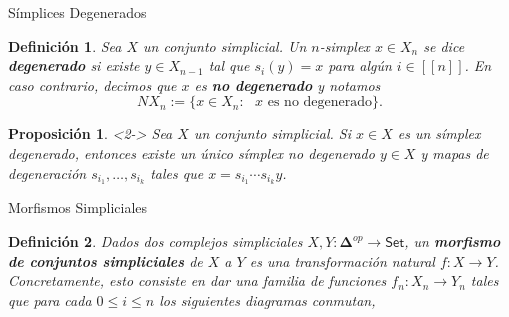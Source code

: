 \documentclass[11pt]{beamer}
\newcommand{\nat}[1]{[\![#1]\!]}
\newcommand{\ord}[1]{\nat{#1}}
\newcommand{\cat}[1]{\mathsf{#1}}
\newcommand{\ordcat}{\boldsymbol{\Delta}}
\newtheorem{defs}{Definición}
\newtheorem{prop}{Proposición}
\begin{document}
\begin{frame}{Símplices Degenerados}
\begin{defs} Sea $X$ un conjunto simplicial. Un $n$-simplex $x \in X_n$ se dice \textbf{degenerado} si existe $y \in X_{n-1}$ tal que $s_i(y) = x$ para algún $i \in \ord{n}$. En caso contrario, decimos que $x$ es \textbf{no degenerado} y notamos 
\[
NX_n := \{x \in X_n : \text{ $x$ es no degenerado}\}.
\]
\end{defs}

\begin{prop}<2->  Sea $X$ un conjunto simplicial. Si $x \in X$ es un símplex degenerado, entonces existe un único símplex no degenerado $y \in X$ y mapas de degeneración $s_{i_1},\dots, s_{i_k}$ tales que $x = s_{i_1} \cdots s_{i_k}y$.
\end{prop}
\end{frame}

\begin{frame}{Morfismos Simpliciales}

\begin{defs} Dados dos complejos simpliciales $X,Y : \ordcat^{op} \to \cat{Set}$, un \textbf{morfismo de conjuntos simpliciales} de $X$ a $Y$ es una transformación natural $f : X \to Y$. Concretamente, esto consiste en dar una familia de funciones $f_n : X_n \to Y_n$ tales que para cada $0 \leq i \leq n$  los siguientes diagramas conmutan,
\begin{center}
\end{center}
\end{defs}
\end{frame}
\end{document}
